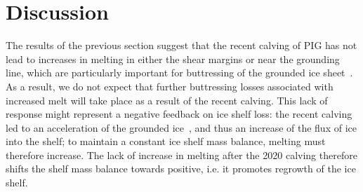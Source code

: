 \documentclass[draft]{agujournal2019}
\begin{document}


\section{Discussion}\label{S:Discussion}
The results of the previous section suggest that the recent calving of PIG has not lead to increases in melting in either the shear margins or near the grounding line, which are particularly important for buttressing of the grounded ice sheet~\cite{Furst2016NatureClimCh, Reese2018NatureClimCh}. As a result, we do not expect that further buttressing losses associated with increased melt will take place as a result of the recent calving. This lack of response might represent a negative feedback on ice shelf loss: the recent calving led to an acceleration of the grounded ice~\cite{Joughin2021ScienceAdv}, and thus an increase of the flux of ice into the shelf; to maintain a constant ice shelf mass balance, melting must therefore increase. The lack of increase in melting after the 2020 calving therefore shifts the shelf mass balance towards positive, i.e. it promotes regrowth of the ice shelf.
\end{document}
